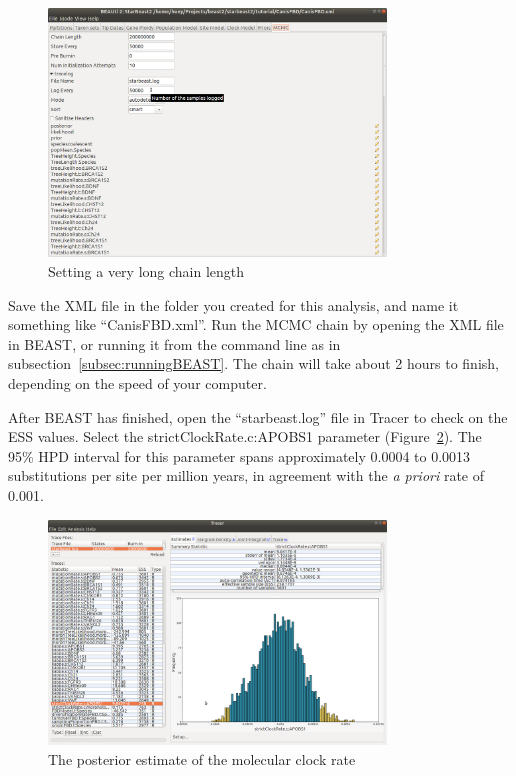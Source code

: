 \documentclass[12pt]{article}
\begin{document}
\begin{figure}[htb!]
\centering
\includegraphics[width=0.8\textwidth]{figures/fbdChainLength.png}
\caption
{Setting a very long chain length}
\label{fig:fbdChainLength}
\end{figure}

Save the XML file in the folder you created for this analysis, and name it
something like ``CanisFBD.xml''. Run the MCMC chain by opening the XML file in
BEAST, or running it from the command line as in
subsection~\ref{subsec:runningBEAST}. The chain will take about 2 hours to
finish, depending on the speed of your computer.

After BEAST has finished, open the ``starbeast.log'' file in Tracer to check
on the ESS values. Select the strictClockRate.c:APOBS1 parameter
(Figure~\ref{fig:strictClockRate}). The 95\% HPD interval for this parameter
spans approximately 0.0004 to 0.0013 substitutions per site per million years,
in agreement with the \textit{a priori} rate of 0.001.

\begin{figure}[htb!]
\centering
\includegraphics[width=0.8\textwidth]{figures/strictClockRate.png}
\caption
{The posterior estimate of the molecular clock rate}
\label{fig:strictClockRate}
\end{figure}
\end{document}
